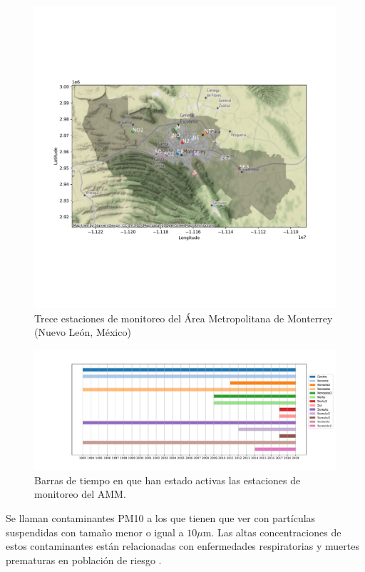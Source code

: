 \documentclass{elsarticle}
\begin{document}
\begin{figure}
\centering
	\includegraphics[width=1\textwidth]{estaciones_amm.pdf}
	\caption{Trece estaciones de monitoreo del Área Metropolitana de Monterrey (Nuevo León, México)}
	\label{estaciones_amm}
\end{figure}

\begin{figure}
\centering
	\includegraphics[width=1\textwidth]{estaciones_rangos.pdf}
	\caption{Barras de tiempo en que han estado activas las estaciones de monitoreo del AMM.}
	\label{estaciones_rangos}
\end{figure}

Se llaman contaminantes PM10 a los que tienen que ver con partículas suspendidas con tamaño menor o igual a $10 \mu$m. Las altas concentraciones de estos contaminantes están relacionadas con enfermedades respiratorias \cite{Pope1991} y muertes prematuras en población de riesgo \cite{Ito1996}. 
\end{document}
